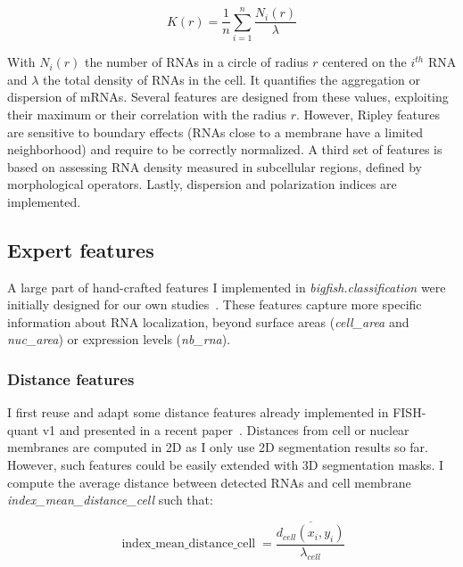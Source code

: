 \begin{equation}
	{\displaystyle K(r) = \frac{1}{n} \sum_{i = 1}^{n} \frac{N_i(r)}{\lambda}}
\end{equation}

\noindent
With $N_i(r)$ the number of \ac{RNA}s in a circle of radius $r$ centered on the $i^{th}$ \ac{RNA} and $\lambda$ the total density of \ac{RNA}s in the cell.
It quantifies the aggregation or dispersion of mRNAs.
Several features are designed from these values, exploiting their maximum or their correlation with the radius $r$.
However, Ripley features are sensitive to boundary effects (\ac{RNA}s close to a membrane have a limited neighborhood) and require to be correctly normalized.
A third set of features is based on assessing \ac{RNA} density measured in subcellular regions, defined by morphological operators. 
Lastly, dispersion and polarization indices are implemented.

\subsection{Expert features}
\label{subsec:expert_features}

A large part of hand-crafted features I implemented in \emph{bigfish.classification} were initially designed for our own studies~\cite{CHOUAIB_2020,safieddine_choreography_2021,pichon_kinesin_2021}.
These features capture more specific information about \ac{RNA} localization, beyond surface areas (\emph{cell\_area} and \emph{nuc\_area}) or expression levels (\emph{nb\_rna}).

\subsubsection{Distance features}

I first reuse and adapt some distance features already implemented in FISH-quant v1 and presented in a recent paper~\cite{samacoits_computational_2018}.
Distances from cell or nuclear membranes are computed in 2D as I only use 2D segmentation results so far.
However, such features could be easily extended with 3D segmentation masks.
I compute the average distance between detected \ac{RNA}s and cell membrane \emph{index\_mean\_distance\_cell} such that:

\begin{equation}
	{\displaystyle \operatorname{index\_mean\_distance\_cell} = \frac{\overline{d_{cell}(x_i, y_i)}}{\lambda_{cell}}}
\end{equation}


